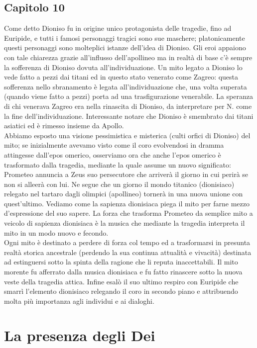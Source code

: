 \documentclass[10pt,a4paper]{article}
\begin{document}
\subsection{Capitolo 10}
Come detto Dioniso fu in origine unico protagonista delle tragedie, fino ad Euripide, e tutti i famosi personaggi tragici sono sue maschere; platonicamente questi personaggi sono molteplici istanze dell'idea di Dioniso. Gli eroi appaiono con tale chiarezza grazie all'influsso dell'apollineo ma in realtà di base c'è sempre la sofferenza di Dioniso dovuta all'individuazione. Un mito legato a Dioniso lo vede fatto a pezzi dai titani ed in questo stato venerato come Zagreo: questa sofferenza nello sbranamento è legata all'individuazione che, una volta superata (quando viene fatto a pezzi) porta ad una trasfigurazione venerabile. La speranza di chi venerava Zagreo era nella rinascita di Dioniso, da interpretare per N. come la fine dell'individuazione. Interessante notare che Dioniso è smembrato dai titani asiatici ed è rimesso insieme da Apollo.\\
Abbiamo esposto una visione pessimistica e misterica (culti orfici di Dioniso) del mito; se inizialmente avevamo visto come il coro evolvendosi in dramma attingesse dall'epos omerico, osserviamo ora che anche l'epos omerico è trasformato dalla tragedia, mediante la quale assume un nuovo significato: Prometeo annuncia a Zeus suo persecutore che arriverà il giorno in cui perirà se non si alleerà con lui. Ne segue che un giorno il mondo titanico (dionisiaco) relegato nel tartaro dagli olimpici (apollineo) tornerà in una nuova unione con quest'ultimo. Vediamo come la sapienza dionisiaca piega il mito per farne mezzo d'espressione del suo sapere. La forza che trasforma Prometeo da semplice mito a veicolo di sapienza dionisiaca è la musica che mediante la tragedia interpreta il mito in un modo nuovo e fecondo.\\
Ogni mito è destinato a perdere di forza col tempo ed a trasformarsi in presunta realtà storica ancestrale (perdendo la sua continua attualità e vivacità) destinata ad estinguersi sotto la spinta della ragione che li reputa inaccettabili. Il mito morente fu afferrato dalla musica dionisiaca e fu fatto rinascere sotto la nuova veste della tragedia attica. Infine esalò il suo ultimo respiro con Euripide che smarrì l'elemento dionisiaco relegando il coro in secondo piano e attribuendo molta più importanza agli individui e ai dialoghi. 
\newpage
\section{La presenza degli Dei}
\end{document}
